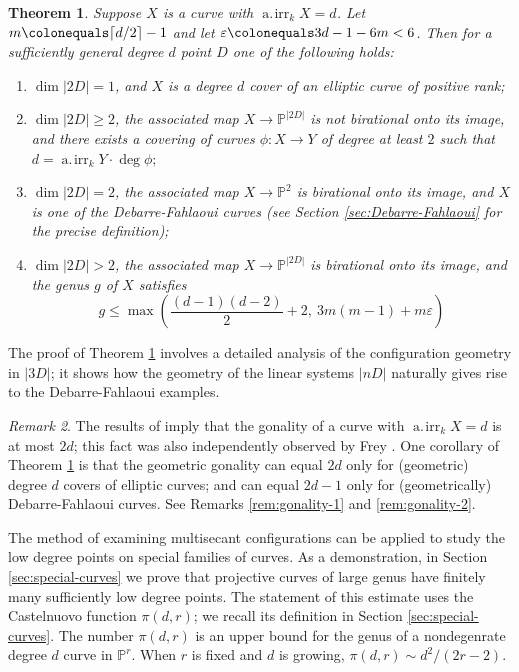 \documentclass[11pt]{amsart}
\newcommand{\PP}{\mathbb{P}}
\newcommand{\airr}{\operatorname{a.\!irr}}
\newtheorem{theorem}{Theorem}[section]
\theoremstyle{definition}
\theoremstyle{remark}
\newtheorem{remark}[theorem]{Remark}
\begin{document}
\begin{theorem}\label{main-finer}
Suppose $X$ is a curve with $\airr_k X =d$. Let $m \colonequals \lceil d/2\rceil -1$ and let $\varepsilon \colonequals 3d-1-6m<6$. Then for a sufficiently general degree $d$ point $D$ one of the following holds:
\begin{enumerate}
    \item $\dim |2D|=1$, and $X$ is a degree $d$ cover of an elliptic curve of positive rank;
    \item $\dim |2D|\geqslant 2$, the associated map $X \to \PP^{|2D|}$ is not birational onto its image, and there exists a covering of curves $\phi \colon X \to Y$ of degree at least $2$ such that $d  =\airr_k Y \cdot \deg \phi ;$
    \item $\dim |2D|=2$, the associated map $X \to \PP^2$ is birational onto its image, and $X$ is one of the Debarre-Fahlaoui curves (see Section \ref{sec:Debarre-Fahlaoui} for the precise definition);
    \item $\dim |2D|>2$,  the associated map $X \to \PP^{|2D|}$ is birational onto its image, and the genus $g$ of $X$ satisfies \[g \leqslant \max\left(\frac{(d-1)(d-2)}{2} + 2, \ 3m(m-1)+m\varepsilon \right)\]
\end{enumerate}

\end{theorem}
The proof of Theorem \ref{main-finer} involves a detailed analysis of the configuration geometry in $|3D|$; it shows how the geometry of the linear systems $|nD|$ naturally gives rise to the Debarre-Fahlaoui examples. 

\begin{remark}
The results of \cite{Abramovich-Harris1991} imply that the gonality of a curve with $\airr_k X = d$ is at most $2d$; this fact was also independently observed by Frey \cite{frey1994}. One corollary of Theorem \ref{main-finer} is that the geometric gonality can equal $2d$ only for (geometric) degree $d$ covers of elliptic curves; and can equal $2d-1$ only for (geometrically) Debarre-Fahlaoui curves. See Remarks \ref{rem:gonality-1} and \ref{rem:gonality-2}. 
\end{remark}

The method of examining multisecant configurations can be applied to study the low degree points on special families of curves.  As a demonstration, in Section \ref{sec:special-curves} we prove that projective curves of large genus have finitely many sufficiently low degree points. The statement of this estimate uses the Castelnuovo function $\pi(d,r)$; we recall its definition in Section \ref{sec:special-curves}. The number $\pi(d,r)$ is an upper bound for the genus of a nondegenrate degree $d$ curve in $\PP^r$. When $r$ is fixed and $d$ is growing, $\pi(d,r) \sim d^2/(2r-2)$.
\end{document}
